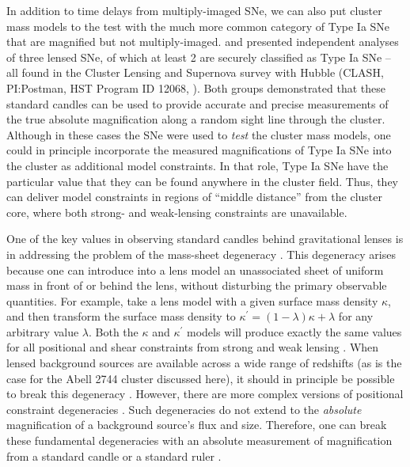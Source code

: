 In addition to time delays from multiply-imaged SNe, we can also
put cluster mass models to the test with the much more common category
of Type Ia SNe that are magnified but not multiply-imaged.  
\citet[][hereafter P14]{Patel:2014} and \citet{Nordin:2014} presented
independent analyses of three lensed SNe, of which at least 2 are
securely classified as Type Ia SNe -- all found in the Cluster Lensing
and Supernova survey with Hubble (CLASH, PI:Postman, HST Program ID
12068, \citealt{Postman:2012}).  Both groups demonstrated that these
standard candles can be used to provide accurate and precise
measurements of the true absolute magnification along a random sight
line through the cluster.  Although in these cases the SNe were used
to {\it test} the cluster mass models, one could in principle
incorporate the measured magnifications of Type Ia SNe into the
cluster as additional model constraints.  In that role, Type Ia SNe
have the particular value that they can be found anywhere in the
cluster field.  Thus, they can deliver model constraints in regions of
``middle distance'' from the cluster core, where both strong- and
weak-lensing constraints are unavailable. 


One of the key values in observing standard candles behind
gravitational lenses is in addressing the problem of the mass-sheet
degeneracy \citep{Falco:1985,Schneider:1995}.  This degeneracy arises
because one can introduce into a lens model an unassociated sheet of
uniform mass in front of or behind the lens, without disturbing the
primary observable quantities.  For example, take a lens model with a
given surface mass density $\kappa$, and then transform the surface
mass density to $\kappa^{\prime}=(1-\lambda)\kappa+\lambda$ for any
arbitrary value $\lambda$.  Both the $\kappa$ and $\kappa^{\prime}$
models will produce exactly the same values for all positional and
shear constraints from strong and weak lensing \citep{Seitz:1997}.
When lensed background sources are available across a wide range of
redshifts (as is the case for the Abell 2744 cluster discussed here),
it should in principle be possible to break this
degeneracy \citep{Seitz:1997,Bradac:2004}.  However, there are more
complex versions of positional constraint
degeneracies \citep{Liesenborgs:2012,Schneider:2014}.  Such
degeneracies do not extend to the {\it absolute} magnification of a
background source's flux and size. 
Therefore, one can break these fundamental degeneracies with an
absolute measurement of magnification from a standard
candle \citep{Holz:2001} or a standard ruler \citep{Sonnenfeld:2011}.

